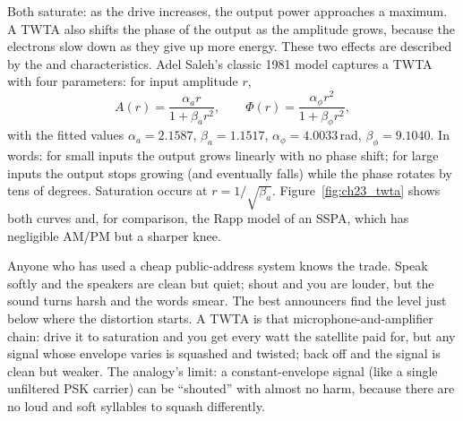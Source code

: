 
Both saturate: as the drive increases, the output power approaches a maximum. A TWTA also shifts
the phase of the output as the amplitude grows, because the electrons slow down as they give up
more energy. These two effects are described by the  and 
characteristics. Adel Saleh's classic 1981 model captures a TWTA with four parameters: for input
amplitude $r$,
\begin{equation}
A(r)=\frac{\alpha_ar}{1+\beta_ar^2},\qquad \Phi(r)=\frac{\alpha_\phi r^2}{1+\beta_\phi r^2},
\label{eq:ch23:saleh}
\end{equation}
with the fitted values $\alpha_a=2.1587$, $\beta_a=1.1517$, $\alpha_\phi=4.0033$\,rad,
$\beta_\phi=9.1040$. In words: for small inputs the output grows linearly with no phase shift;
for large inputs the output stops growing (and eventually falls) while the phase rotates by tens of
degrees. Saturation occurs at $r=1/\sqrt{\beta_a}$. Figure~\ref{fig:ch23_twta} shows both curves
and, for comparison, the Rapp model of an SSPA, which has negligible AM/PM but a sharper knee.


\begin{analogy}
Anyone who has used a cheap public-address system knows the trade. Speak softly and the speakers
are clean but quiet; shout and you are louder, but the sound turns harsh and the words smear.
The best announcers find the level just below where the distortion starts. A TWTA is that
microphone-and-amplifier chain: drive it to saturation and you get every watt the satellite paid
for, but any signal whose envelope varies is squashed and twisted; back off and the signal is
clean but weaker. The analogy's limit: a constant-envelope signal (like a single unfiltered PSK
carrier) can be ``shouted'' with almost no harm, because there are no loud and soft syllables to
squash differently.
\end{analogy}

